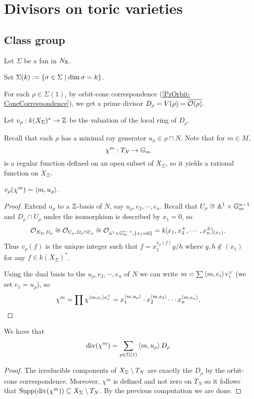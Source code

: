 \chapter{Divisors on toric varieties}

\section{Class group}
Let $\Sigma$ be a fan in $N_{\mathbb{R}}$. 
\begin{notation}
Set $\Sigma(k):=\left\{{\sigma\in \Sigma\mid \dim \sigma=k}\right\}$.
\end{notation}

For each $\rho\in \Sigma(1)$, by orbit-cone correspondence (\ref{PrOrbit-ConeCorrespondence}), we get a prime divisor $D_\rho=V(\rho)=\overline{\mathcal{O}(\rho)}$.

Let $v_\rho:k(X_\Sigma)^\ast\to \mathbb{Z}$ be the valuation of the local ring of $D_\rho$.


Recall that each $\rho$ has a minimal ray generator $u_\rho\in \rho\cap N$. Note that for $m\in M$, 
\[\chi^m:T_N\to \mathbb{G}_m\]
is a regular function defined on an open subset of $X_\Sigma$, so it yields a rational function on $X_\Sigma$.

\begin{proposition}[]\label{PrValuationOfCharacter}
$v_\rho(\chi^m)=\left\langle {m,u_\rho}\right\rangle$.
\end{proposition}
\begin{proof}
Extend $u_\rho$ to a $\mathbb{Z}$-basis of $N$, say $u_\rho,e_2,\cdots, e_n$.
Recall that $U_\rho\cong \mathbb{A}^1\times\mathbb{G}_m^{n-1}$ and $D_\rho\cap U_\rho$ under the isomorphism is described by $x_1=0$, so \[\mathcal{O}_{X_\Sigma,D_\rho}\cong \mathcal{O}_{U_\rho,D_\rho\cap U_\rho}\cong \mathcal{O}_{\mathbb{A}^1\times\mathbb{G}_m^{n-1},\left\{{x_1=0}\right\}}= k[x_1,x_2^{\pm},\cdots, x_n^{\pm}]_{(x_1)}.\]
Thus $v_\rho(f)$ is the unique integer such that $f=x_1^{v_\rho(f)}g/h$ where $g,h\notin (x_1)$ for any $f\in k(X_\Sigma)^\ast$.

Using the dual basis to the $u_\rho,e_2,\cdots, e_n$ of $N$ we can write $m=\sum \left\langle {m,e_i}\right\rangle e_i^\vee$ (we set $e_1=u_\rho$), so
\[\chi^m=\prod \chi^{\left\langle {m,e_i}\right\rangle e_i^\vee}=x_1^{\left\langle {m,u_\rho}\right\rangle}\cdot x_2^{\left\langle {m,e_2}\right\rangle}\cdots x_n^{\left\langle {m,e_n}\right\rangle}.\]
\end{proof}


\begin{proposition}[]
We have that
\[\mathrm{div}(\chi^m)=\sum_{\rho\in\Sigma(1)}\left\langle {m,u_\rho}\right\rangle D_\rho\]
\end{proposition}
\begin{proof}
The irreducible components of $X_\Sigma\setminus T_N$ are exactly the $D_\rho$ by the orbit-cone correspondence. Moreover, $\chi^m$ is defined and not zero on $T_N$ so it follows that $\operatorname{Supp}(\mathrm{div}(\chi^m))\subseteq X_\Sigma\setminus T_N$. By the previous computation we are done.
\end{proof}



